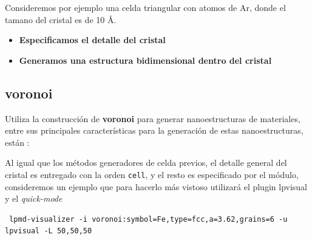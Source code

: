 
Consideremos por ejemplo una celda triangular con atomos de Ar, donde el tamano del cristal es de 10 \AA.

\begin{itemize}
 \item \textbf{Especificamos el detalle del cristal}
 \item \textbf{Generamos una estructura bidimensional dentro del cristal}
\end{itemize}

\subsection{voronoi}
Utiliza la construcci\'on de \textbf{voronoi} para generar nanoestructuras de materiales, entre sus principales caracter\'isticas para la generaci\'on de estas nanoestructuras, est\'an :


Al igual que los m\'etodos generadores de celda previos, el detalle general del cristal es entregado con la orden \verb|cell|, y el resto es especificado por el m\'odulo, consideremos un ejemplo que para hacerlo m\'as vistoso utilizar\'a el plugin lpvisual y el \textit{quick-mode}

\begin{verbatim}
 lpmd-visualizer -i voronoi:symbol=Fe,type=fcc,a=3.62,grains=6 -u lpvisual -L 50,50,50
\end{verbatim}


